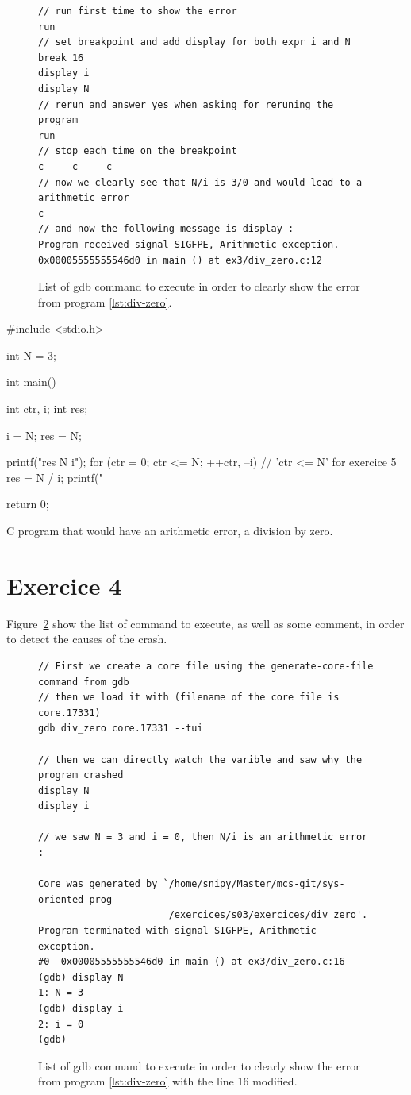 \documentclass[a4paper,11pt]{report}
\begin{document}
\begin{figure}[ht]
  \centering
\begin{verbatim}
// run first time to show the error
run
// set breakpoint and add display for both expr i and N
break 16
display i
display N
// rerun and answer yes when asking for reruning the program
run
// stop each time on the breakpoint
c     c     c
// now we clearly see that N/i is 3/0 and would lead to a arithmetic error
c
// and now the following message is display :
Program received signal SIGFPE, Arithmetic exception.
0x00005555555546d0 in main () at ex3/div_zero.c:12
\end{verbatim}
  \caption{\label{fig:gdb-script} List of gdb command to execute in order to
    clearly show the error from program \ref{lst:div-zero}.}
\end{figure}

\begin{listing}[ht]
\centering
\begin{clinecode}
#include <stdio.h>

int N = 3;

int main()
{
   int ctr, i;
   int res;

   i = N;
   res = N;

   printf("res  N  i\n");
   for (ctr = 0; ctr <= N; ++ctr, --i)
   { // 'ctr <= N' for exercice 5
      res = N / i;
      printf("%
   }

   return 0;
}
\end{clinecode}
\caption{C program that would have an arithmetic error, a division by zero.}
\label{lst:div-zero}
\end{listing}

\newpage

\section*{Exercice 4}

Figure~\ref{fig:gdb-script-b} show the list of command to execute, as well as some
comment, in order to detect the causes of the crash.

\begin{figure}[ht]
  \centering
\begin{verbatim}
// First we create a core file using the generate-core-file command from gdb
// then we load it with (filename of the core file is core.17331)
gdb div_zero core.17331 --tui

// then we can directly watch the varible and saw why the program crashed
display N
display i

// we saw N = 3 and i = 0, then N/i is an arithmetic error :

Core was generated by `/home/snipy/Master/mcs-git/sys-oriented-prog
                       /exercices/s03/exercices/div_zero'.
Program terminated with signal SIGFPE, Arithmetic exception.
#0  0x00005555555546d0 in main () at ex3/div_zero.c:16
(gdb) display N
1: N = 3
(gdb) display i
2: i = 0
(gdb) 
\end{verbatim}
  \caption{\label{fig:gdb-script-b} List of gdb command to execute in order to
    clearly show the error from program \ref{lst:div-zero} with the line 16
    modified.}
\end{figure}
\end{document}
